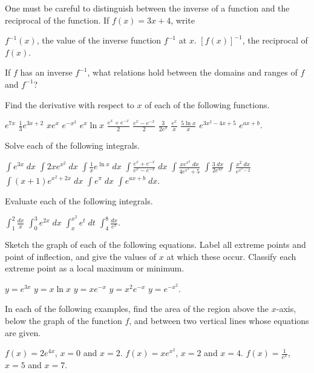 \begin{exercises}

One must be careful to distinguish between the
inverse of a function and the reciprocal of the function.
If $f(x) = 3x + 4$, write
\begin{exenum}
\x
$f^{-1}(x)$, the value of the inverse function
$f^{-1}$ at $x$.
\x
$[f(x)]^{-1}$, the reciprocal of $f(x)$.
\end{exenum}

If $f$ has an inverse $f^{-1}$,
what relations hold between the domains and ranges
of $f$ and $f^{-1}$?

Find the derivative with respect to $x$
of each of the following functions.
\begin{exenum}
\x
$e^{7x}$
\x
$\frac13e^{3x+2}$
\x
$xe^x$
\x
$e^{-x^2}$
\x
$e^x \ln x$
\x
$\frac{e^x+e^{-x}}2$
\x
$\frac{e^x-e^{-x}}2$
\x
$\frac3{2e^x}$
\x
$\frac{e^x}x$
\x
$\frac{5\ln x}x$
\x
$e^{3x^2 - 4x + 5}$
\x
$e^{ax+b}$.
\end{exenum}

Solve each of the following integrals.
\begin{exenum}
\x
$\int e^{3x} \;dx$
\x
$\int 2xe^{x^2} \;dx$
\x
$\int \frac1x e^{\ln x} \;dx$
\x
$\int \frac{e^x + e^{-x}}{e^x - e^{-x}} \;dx$
\x
$\int \frac{xe^{x^2} \;dx}{4e^{x^2} + 5}$
\x
$\int \frac {3\;dx}{2e^{4x}}$
\x
$\int \frac {x^2\;dx}{e^{x^3-2}}$
\x
$\int (x+1) e^{x^2+2x} \; dx$
\x
$\int e^\pi \;dx$
\x
$\int e^{ax+b} \;dx$.
\end{exenum}

Evaluate each of the following integrals.
\begin{exenum}
\x
$\int_1^2 \frac{dx}x$
\x
$\int_0^3 e^{2x} \;dx$
\x
$\int_x^{x^2} e^t \; dt$
\x
$\int_4^8 \frac{dx}{e^x}$.
\end{exenum}

Sketch the graph of each of the following equations.
Label all extreme points and point of inflection,
and give the values of $x$ at which these occur.
Classify each extreme point as a local
maximum or minimum.
\begin{exenum}
\x
$y=e^{3x}$
\x
$y=x \ln x$
\x
$y = xe^{-x}$
\x
$y = x^2e^{-x}$
\x
$y = e^{-x^2}$.
\end{exenum}

In each of the following examples,
find the area of the region above the $x$-axis,
below the graph of the function $f$,
and between two vertical lines whose equations
are given.
\begin{exenum}
\x
$f(x) = 2e^{4x}$, $x=0$ and $x=2$.
\x
$f(x) = xe^{x^2}$, $x=2$ and $x=4$.
\x
$f(x) = \frac1{e^x}$, $x=5$ and $x=7$.
\end{exenum}


\end{exercises}
